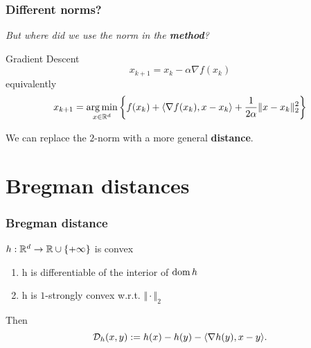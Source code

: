 \documentclass{beamer}
\begin{document}
\begin{frame}
  \frametitle{Different norms?}
  \begin{center}
    \textit{But where did we use the norm in the \textbf{method}?}
  \end{center}

  \begin{block}{Gradient Descent}
    \begin{equation}
      x_{k+1} = x_k - \alpha \nabla f(x_k)
    \end{equation}
    equivalently
    \begin{equation}
      x_{k+1} = \operatorname*{arg\,min}_{x \in \mathbb{R}^d} \left\{ f(x_k) + \langle \nabla f(x_k), x-x_k \rangle + \frac{1}{2 \alpha} \Vert x-x_k  \Vert_2^2 \right\}
    \end{equation}
  \end{block}
  We can replace the $2$-norm with a more general \textbf{distance}.
\end{frame}


\section{Bregman distances}%

\begin{frame}
  \frametitle{Bregman distance}
  $h: \mathbb{R}^d \to \mathbb{R} \cup \{+\infty\}$ is convex
  \begin{enumerate}
    \item h is differentiable of the interior of $\operatorname*{dom} h$
    \item h is $1$-strongly convex w.r.t. $\Vert \cdot \Vert_2$
  \end{enumerate}
  Then
  \begin{equation}
    \mathcal{D}_h(x,y) := h(x) - h(y) - \langle \nabla h(y), x-y \rangle.
  \end{equation}

\end{frame}
\end{document}
